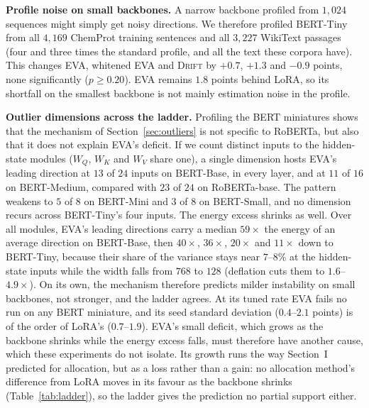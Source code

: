 \documentclass[conference,onecolumn]{IEEEtran}
\newcommand{\method}{\textsc{Drift}}
\begin{document}
\noindent\textbf{Profile noise on small backbones.} A narrow backbone profiled
from $1{,}024$ sequences might simply get noisy directions. We therefore
profiled BERT-Tiny from all $4{,}169$ ChemProt training sentences and all
$3{,}227$ WikiText passages (four and three times the standard profile, and all
the text these corpora have). This changes EVA, whitened EVA and \method{} by
$+0.7$, $+1.3$ and $-0.9$ points, none significantly ($p \ge 0.20$). EVA
remains $1.8$ points behind LoRA, so its shortfall on the smallest backbone is
not mainly estimation noise in the profile.

\noindent\textbf{Outlier dimensions across the ladder.} Profiling the BERT
miniatures shows that the mechanism of Section~\ref{sec:outliers} is not
specific to RoBERTa, but also that it does not explain EVA's deficit. If we count
distinct inputs to the hidden-state modules ($W_Q$, $W_K$ and $W_V$ share one),
a single dimension hosts EVA's leading direction at $13$ of $24$ inputs on
BERT-Base, in every layer, and at $11$ of $16$ on BERT-Medium, compared with
$23$ of $24$ on RoBERTa-base. The pattern weakens to $5$ of $8$ on BERT-Mini and
$3$ of $8$ on BERT-Small, and no dimension recurs across BERT-Tiny's four
inputs. The energy excess shrinks as well. Over all modules, EVA's leading
directions carry a median $59\times$ the energy of an average direction on
BERT-Base, then
$40\times$, $36\times$, $20\times$ and $11\times$ down to BERT-Tiny, because
their share of the variance stays near $7$--$8\%$ at the hidden-state inputs
while the width falls from $768$ to $128$ (deflation cuts them to
$1.6$--$4.9\times$). On its own, the mechanism therefore predicts milder
instability on small backbones, not stronger, and the ladder agrees. At its
tuned rate EVA fails no run on any BERT miniature, and its seed standard
deviation ($0.4$--$2.1$ points) is of the order of LoRA's ($0.7$--$1.9$). EVA's
small deficit, which grows as the backbone shrinks while the energy excess
falls, must therefore have another cause, which these experiments do not
isolate. Its growth runs the way Section~I predicted for
allocation, but as a loss rather than a gain: no allocation method's difference
from LoRA moves in its favour as the backbone shrinks (Table~\ref{tab:ladder}),
so the ladder gives the prediction no partial support either.

\end{document}
